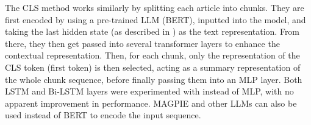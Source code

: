The CLS method works similarly by splitting each article into chunks. They are first encoded by using a pre-trained LLM (BERT), inputted into the model, and taking the last hidden state (as described in \cite{sun-2020-fine-tune}) as the text representation. From there, they then get passed into several transformer layers to enhance the contextual representation. Then, for each chunk, only the representation of the CLS token (first token) is then selected, acting as a summary representation of the whole chunk sequence, before finally passing them into an MLP layer. Both LSTM and Bi-LSTM layers were experimented with instead of MLP, with no apparent improvement in performance. MAGPIE and other LLMs can also be used instead of BERT to encode the input sequence.

